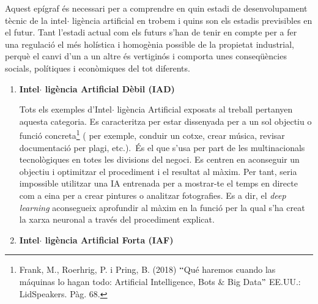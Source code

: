 \documentclass[12pt]{article}
\begin{document}
\vspace{\baselineskip}
\begin{justify}
Aquest epígraf és necessari per a comprendre en quin estadi de desenvolupament tècnic de la intel$ \cdot $ ligència artificial en trobem i quins son els estadis previsibles en el futur. Tant l’estadi actual com els futurs s’han de tenir en compte per a fer una regulació el més holística i homogènia possible de la propietat industrial, perquè el canvi d’un a un altre és vertiginós i comporta unes conseqüències socials, polítiques i econòmiques del tot diferents.
\end{justify}\par


\vspace{\baselineskip}
\begin{enumerate}
	\item \textbf{Intel$ \cdot $ ligència Artificial Dèbil (IAD)}\par


\vspace{\baselineskip}
\begin{justify}
Tots els exemples d’Intel$ \cdot $ ligència Artificial exposats al treball pertanyen aquesta categoria. Es caracteritza per estar dissenyada per a un sol objectiu o funció concreta\footnote{ Frank, M., Roerhrig, P. i Pring, B. (2018) $``$Qué haremos cuando las máquinas lo hagan todo: Artificial Intelligence, Bots $\&$  Big Data$"$  EE.UU.: LidSpeakers. Pàg. 68.  } ( per exemple, conduir un cotxe, crear música, revisar documentació per plagi, etc.).\  És el que s’usa per part de les multinacionals tecnològiques en totes les divisions del negoci. Es centren en aconseguir un objectiu i optimitzar el procediment i el resultat al màxim. Per tant, seria impossible utilitzar una IA entrenada per a mostrar-te el temps en directe com a eina per a crear pintures o analitzar fotografies. Es a dir, el \textit{deep learning} aconsegueix aprofundir al màxim en la funció per la qual s’ha creat la xarxa neuronal a través del procediment explicat.
\end{justify}\par


\vspace{\baselineskip}
	\item \textbf{Intel$ \cdot $ ligència Artificial Forta (IAF)}\par



\end{enumerate}
\end{document}
